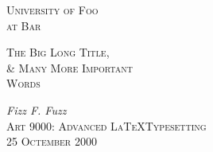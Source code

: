 \documentclass[letterpaper,titlepage,12pt]{article} %
\begin{document}
\begin{titlepage}
	\centering
	{\scshape\Large University of Foo \\ at Bar\par}
	\vspace{5cm}
	{\scshape\LARGE The Big Long Title,\\ \& Many More Important\\ Words\par}
	\vfill
	{\Large\itshape Fizz F. Fuzz\\}
	{\Large\scshape Art 9000: Advanced \LaTeX Typesetting\\}
	{\Large\scshape 25 Octember 2000\\}

\vspace{5cm}
\end{titlepage}

\tableofcontents
\listoffigures





\newpage
{}
\printbibliography[heading=none]
\end{document}
